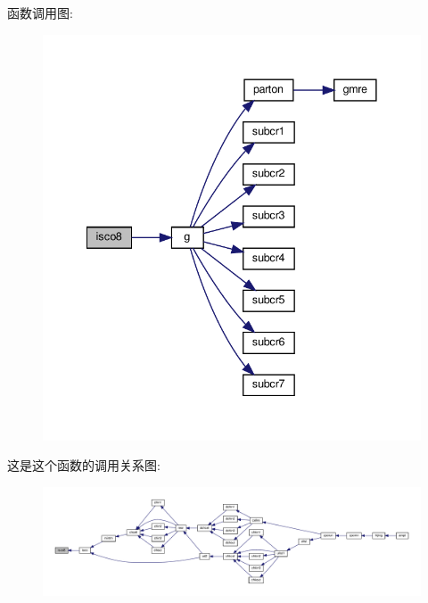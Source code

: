 函数调用图\+:
\nopagebreak
\begin{figure}[H]
\begin{center}
\leavevmode
\includegraphics[width=341pt]{isco8_8f90_a9450ed474edefee41ccc0db34a32174e_cgraph}
\end{center}
\end{figure}
这是这个函数的调用关系图\+:
\nopagebreak
\begin{figure}[H]
\begin{center}
\leavevmode
\includegraphics[width=350pt]{isco8_8f90_a9450ed474edefee41ccc0db34a32174e_icgraph}
\end{center}
\end{figure}
